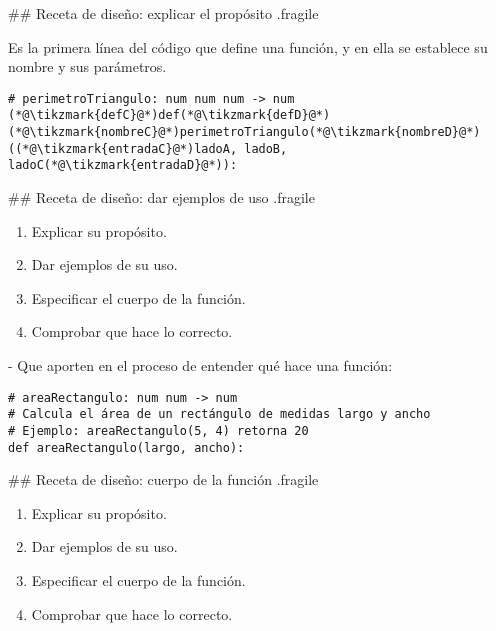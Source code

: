 ## Receta de diseño: explicar el propósito {.fragile}


\bgnblockdefinition
{} Es la primera línea del código que define una función, y
en ella se establece su nombre y sus parámetros.
\trmblockdefinition

\pause

\begin{lstlisting}[basicstyle=\normalsize\ttfamily,linewidth=.9\textwidth,xleftmargin=.1\textwidth]
# perimetroTriangulo: num num num -> num
(*@\tikzmark{defC}@*)def(*@\tikzmark{defD}@*) (*@\tikzmark{nombreC}@*)perimetroTriangulo(*@\tikzmark{nombreD}@*)((*@\tikzmark{entradaC}@*)ladoA, ladoB, ladoC(*@\tikzmark{entradaD}@*)):
\end{lstlisting}


## Receta de diseño: dar ejemplos de uso {.fragile}

    \begin{enumerate}
        \item Explicar su propósito.
        \item \alert{Dar ejemplos de su uso.}
        \item Especificar el cuerpo de la función.
        \item Comprobar que hace lo correcto.
    \end{enumerate}
\trmblockgood

- Que aporten en el proceso de entender qué hace una función:

\begin{lstlisting}[style=frame02,linebackgroundcolor={\btLstHL{3}}]
# areaRectangulo: num num -> num
# Calcula el área de un rectángulo de medidas largo y ancho
# Ejemplo: areaRectangulo(5, 4) retorna 20
def areaRectangulo(largo, ancho):
\end{lstlisting}

## Receta de diseño: cuerpo de la función {.fragile}

    \begin{enumerate}
        \item Explicar su propósito.
        \item Dar ejemplos de su uso.
        \item \alert{Especificar el cuerpo de la función.}
        \item Comprobar que hace lo correcto.
    \end{enumerate}
\trmblockgood

